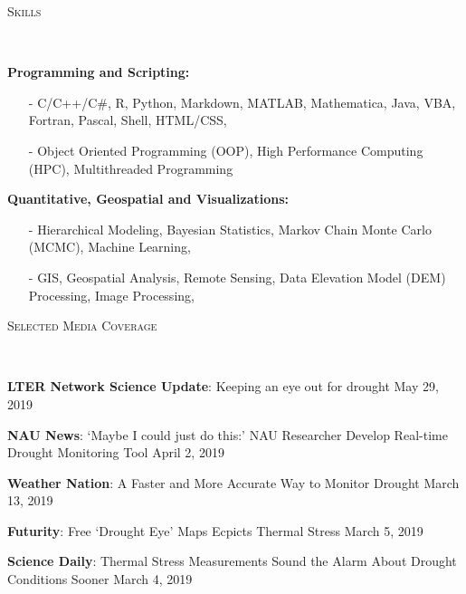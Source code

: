 \documentclass[10pt]{article}
\newenvironment{changemargin}[2]{%
  \begin{list}{}{%
 \setlength{\topsep}{0pt}%
 \setlength{\leftmargin}{#1}%
 \setlength{\rightmargin}{#2}%
 \setlength{\listparindent}{\parindent}%
 \setlength{\itemindent}{\parindent}%
 \setlength{\parsep}{\parskip}%
  }%
  \item[]}{\end{list}
}
\newcommand{\lineover}{
  \begin{changemargin}{-0.05in}{-0.05in}
  \vspace*{-8pt}
  \hrulefill \\
  \vspace*{-2pt}
  \end{changemargin}
}
\newcommand{\header}[1]{
  \begin{changemargin}{-0.5in}{-0.5in}
  \scshape{#1}\\
  \lineover
  \end{changemargin}
}
\newenvironment{body} {
  \vspace*{-2pt}
  \begin{changemargin}{-0.5in}{-0.5in}
}
{\end{changemargin}
}
\begin{document}

\header{Skills}

\begin{body}
  \textbf{Programming and Scripting:} \\
  \vspace*{-4pt}
  \begin{itemize} \itemsep -0pt
    \item[-] C/C++/C\#, R, Python, Markdown, MATLAB, Mathematica, Java, VBA, Fortran, Pascal, Shell, HTML/CSS,\\
    \item[-] Object Oriented Programming (OOP), High Performance Computing (HPC), Multithreaded Programming\\
  \end{itemize}

  \textbf{Quantitative, Geospatial and Visualizations:} \\
  \vspace*{-4pt}
  \begin{itemize} \itemsep -0pt
    \item[-] Hierarchical Modeling, Bayesian Statistics, Markov Chain Monte Carlo (MCMC), Machine Learning, \\
    \item[-] GIS, Geospatial Analysis, Remote Sensing, Data Elevation Model (DEM) Processing, Image Processing, \\
  \end{itemize}

\end{body}
\smallskip


\header{Selected Media Coverage}

\begin{body}

  \textbf{LTER Network Science Update}: Keeping an eye out for drought \hfill{May 29, 2019}\\
  \smallskip

  \textbf{NAU News}: ‘Maybe I could just do this:’ NAU Researcher Develop Real-time Drought Monitoring Tool \hfill{April 2, 2019}\\
  \smallskip

  \textbf{Weather Nation}: A Faster and More Accurate Way to Monitor Drought \hfill{March 13, 2019}\\
  \smallskip

  \textbf{Futurity}: Free ‘Drought Eye’ Maps Ecpicts Thermal Stress \hfill{March 5, 2019}\\
  \smallskip

  \textbf{Science Daily}: Thermal Stress Measurements Sound the Alarm About Drought Conditions Sooner \hfill{March 4, 2019}\\

\end{body}
\end{document}
